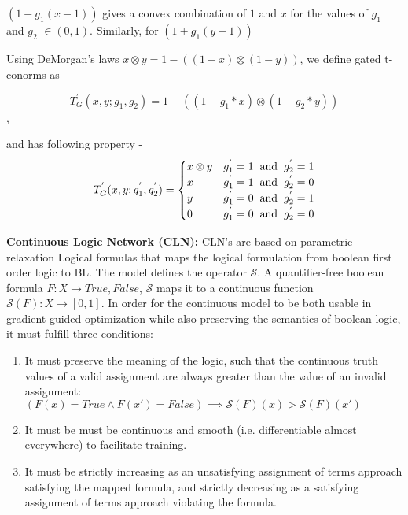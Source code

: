 \noindent $(1 + g_{1}(x - 1))$ gives a convex combination of $1$ and $x$ for the values of $g_{1}$ and $g_{2}$ $\in (0, 1)$.
Similarly, for $(1 + g_{1}(y - 1))$

Using DeMorgan’s laws $x \otimes y = 1 - ((1 - x) \otimes (1 - y))$, we define gated t-conorms as

$$T_{G}^{'}(x,y;g_{1},g_{2}) = 1 - ((1 - g_{1}*x) \otimes (1 - g_{2}*y))$$,

and has following property - 
\[
    T_{G}^{'}(x,y;g_{1}^{'},g_{2}^{'})= 
\begin{cases}
    x \otimes y & g_{1}^{'} = 1 \hspace{2mm} \text{and} \hspace{2mm} g_{2}^{'} = 1\\
    x & g_{1}^{'} = 1 \hspace{2mm} \text{and} \hspace{2mm} g_{2}^{'} = 0\\
    y & g_{1}^{'} = 0 \hspace{2mm} \text{and} \hspace{2mm} g_{2}^{'} = 1\\
    0 & g_{1}^{'} = 0 \hspace{2mm} \text{and} \hspace{2mm} g_{2}^{'} = 0
\end{cases}
\]

\noindent\textbf{Continuous Logic Network (CLN):} CLN's are based on parametric relaxation Logical formulas that maps the logical formulation from boolean first order logic to BL.
The model defines the operator $\mathcal{S}$. A quantifier-free boolean formula $F: X \rightarrow {True, False}$, $\mathcal{S}$ maps it to a continuous function 
$\mathcal{S}(F): X \rightarrow [0, 1]$. In order for the continuous model to be both usable in gradient-guided optimization while also preserving the semantics of boolean
logic, it must fulfill three conditions:

\begin{enumerate}
    \item It must preserve the meaning of the logic, such that the continuous truth values of a valid assignment are always greater than the value of an invalid assignment:
        $(F(x) = True \wedge F(x') = False) \implies \mathcal{S}(F)(x) > \mathcal{S}(F)(x')$
    \item It must be must be continuous and smooth (i.e. differentiable almost everywhere) to facilitate training.
    \item It must be strictly increasing as an unsatisfying assignment of terms approach satisfying the mapped formula,
and strictly decreasing as a satisfying assignment of
terms approach violating the formula.
\end{enumerate}

